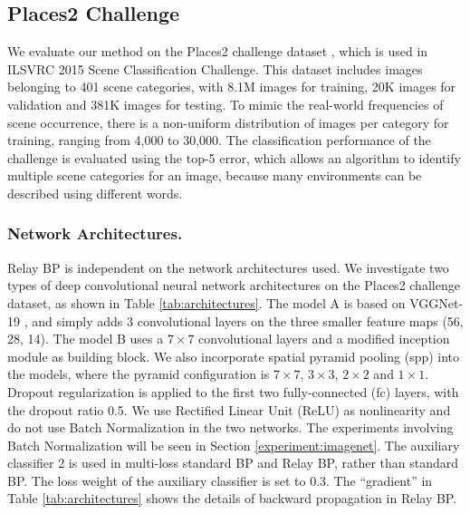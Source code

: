 \documentclass[runningheads]{llncs}
\begin{document}
\subsection{Places2 Challenge}
We evaluate our method on the Places2 challenge dataset \cite{zhou_2015}, which is used in ILSVRC 2015 Scene Classification Challenge. This dataset includes images belonging to 401 scene categories, with 8.1M images for training, 20K images for validation and 381K images for testing. To mimic the real-world frequencies of scene occurrence, there is a non-uniform distribution of images per category for training, ranging from 4,000 to 30,000. The classification performance of the challenge is evaluated using the top-5 error, which allows an algorithm to identify multiple scene categories for an image, because many environments can be described using different words.

\subsubsection{Network Architectures.} Relay BP is independent on the network architectures used. We investigate two types of deep convolutional neural network architectures on the Places2 challenge dataset, as shown in Table \ref{tab:architectures}.
The model A is based on VGGNet-19 \cite{simonyan_iclr2015}, and simply adds 3 convolutional layers on the three smaller feature maps (56, 28, 14).
The model B uses a $7\times7$ convolutional layers and a modified inception module as building block.
We also incorporate spatial pyramid pooling (spp) \cite{he_eccv2014} into the models, where the pyramid configuration is $7\times7$, $3\times3$, $2\times2$ and $1\times1$. Dropout regularization is applied to the first two fully-connected (fc) layers, with the dropout ratio 0.5.
We use Rectified Linear Unit (ReLU) as nonlinearity and do not use Batch Normalization \cite{ioffe_2015} in the two networks.
The experiments involving Batch Normalization will be seen in Section \ref{experiment:imagenet}.
The auxiliary classifier \normalsize\textcircled{\scriptsize{2}} is used in multi-loss standard BP and Relay BP, rather than standard BP.
The loss weight of the auxiliary classifier is set to 0.3.
The ``gradient'' in Table \ref{tab:architectures} shows the details of backward propagation in Relay BP.
\end{document}
